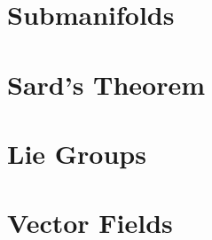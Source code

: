 \chapter{Submanifolds}
\label{chap:submanifolds}


\chapter{Sard's Theorem}
\label{chap:sards-theorem}


\chapter{Lie Groups}
\label{chap:lie-groups}


\chapter{Vector Fields}
\label{chap:vector-fields}

